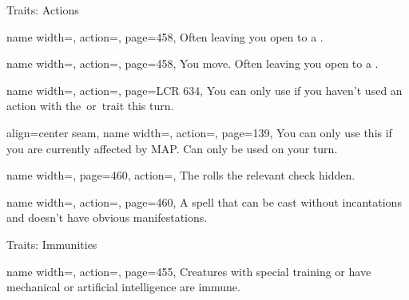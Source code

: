 \begin{PageFront}
\begin{Tables}{\frontTableHeight}
\begin{Table}{Traits: Actions}
\begin{entry}{}{%
                name width=\conditionLength,%
                action=\Manipulate,
                page=458,
            }
                Often leaving you open to a .
            \end{entry}
            \begin{entry}{}{%
                name width=\conditionLength,%
                action=\Move,
                page=458,
            }
                You move.
                Often leaving you open to a .
            \end{entry}
            \begin{entry}{}{%
                name width=\conditionLength,%
                action=\Open,
                page=LCR 634,
            }
                You can only use if you haven't used an action with the \Attack\,or \Open\,trait this turn.
            \end{entry}
            \begin{entry}{}{%
                align=center seam,
                name width=\conditionLength,%
                action=\Press,
                page=139,
            }
                You can only use this if you are currently affected by MAP. Can only be used on your turn.\\
            \end{entry}
            \begin{entry}{}{%
                name width=\conditionLength,%
                page=460,
                action=\Secret {},
            }
                The \GM rolls the relevant check hidden.
            \end{entry}
            \begin{entry}{}{%
                name width=\conditionLength,%
                action=\Subtle,
                page=460,
            }
                A spell that can be cast without incantations and doesn't have obvious manifestations. \hfill
            \end{entry}
        \end{Table}
        \TableSpace
        \begin{Table}{Traits: Immunities}
            \begin{entry}{}{%
                name width=\conditionLength,%
                action=\Emotion,
                page=455,
            }
                Creatures with special training or have mechanical or artificial intelligence are immune.

\end{entry}
\end{Table}
\end{Tables}
\end{PageFront}
